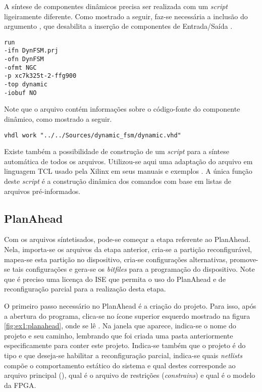 \documentclass[11pt,a4paper,oneside]{book}
\begin{document}
A síntese de componentes dinâmicos precisa ser realizada com um \textit{script}  ligeiramente diferente.
Como mostrado a seguir, faz-se necessária a inclusão do argumento , que desabilita a inserção de componentes de Entrada/Saída \cite{ug743, ug748}.
\begin{lstlisting}[style=customVHDL]
run
-ifn DynFSM.prj
-ofn DynFSM
-ofmt NGC
-p xc7k325t-2-ffg900
-top dynamic
-iobuf NO
\end{lstlisting}
Note que o arquivo  contém informações sobre o código-fonte do componente dinâmico, como mostrado a seguir.
\begin{lstlisting}[style=customVHDL]
vhdl work "../../Sources/dynamic_fsm/dynamic.vhd"
\end{lstlisting}

Existe também a possibilidade de construção de um \textit{script} para a síntese automática de todos os arquivos.
Utilizou-se aqui uma adaptação do arquivo em linguagem TCL usado pela Xilinx em seus manuais e exemplos \cite{ug702, ug743, ug744}.
A única função deste \textit{script} é a construção dinâmica dos comandos com base em listas de arquivos pré-informados.

\subsection{PlanAhead}
Com os arquivos síntetisados, pode-se começar a etapa referente ao PlanAhead.
Nela, importa-se os arquivos da etapa anterior, cria-se a partição reconfigurável, mapea-se esta partição no dispositivo, cria-se configurações alternativas, promove-se tais configurações e gera-se os \textit{bitfiles} para a programação do dispositivo.
Note que é preciso uma licença do ISE que permita o uso do PlanAhead e de reconfiguração parcial para a realização desta etapa.

O primeiro passo necessário no PlanAhead é a criação do projeto.
Para isso, após a abertura do programa, clica-se no ícone superior esquerdo mostrado na figura \ref{fig:ex1:planahead}, onde se lê .
Na janela que aparece, indica-se o nome do projeto e seu caminho, lembrando que foi criada uma pasta anteriormente especificamente para conter este projeto.
Indica-se também que o projeto é do tipo  e que deseja-se habilitar a reconfiguração parcial, indica-se quais \textit{netlists} compõe o comportamento estático do sistema e qual destes corresponde ao arquivo principal (), qual é o arquivo de restrições (\textit{constrains}) e qual é o modelo da FPGA.
\end{document}
